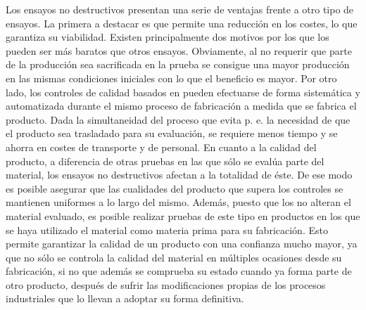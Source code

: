 Los ensayos no destructivos presentan una serie de ventajas frente a otro tipo de ensayos. La primera a destacar es que permite una reducción en los costes, lo que garantiza su viabilidad. Existen principalmente dos motivos por los que los  pueden ser más baratos que otros ensayos. Obviamente, al no requerir que parte de la producción sea sacrificada en la prueba se consigue una mayor producción en las mismas condiciones iniciales con lo que el beneficio es mayor. Por otro lado, los controles de calidad basados en  pueden efectuarse de forma sistemática y automatizada durante el mismo proceso de fabricación a medida que se fabrica el producto. Dada la simultaneidad del proceso que evita p. e. la necesidad de que el producto sea trasladado para su evaluación, se requiere menos tiempo y se ahorra en costes de transporte y de personal. En cuanto a la calidad del producto, a diferencia de otras pruebas en las que sólo se evalúa parte del material, los ensayos no destructivos afectan a la totalidad de éste. De ese modo es posible asegurar que las cualidades del producto que supera los controles se mantienen uniformes a lo largo del mismo. Además, puesto que los  no alteran el material evaluado, es posible realizar pruebas de este tipo en productos en los que se haya utilizado el material como materia prima para su fabricación. Esto permite garantizar la calidad de un producto con una confianza mucho mayor, ya que no sólo se controla la calidad del material en múltiples ocasiones desde su fabricación, si no que además se comprueba su estado cuando ya forma parte de otro producto, después de sufrir las modificaciones propias de los procesos industriales que lo llevan a adoptar su forma definitiva.\par
